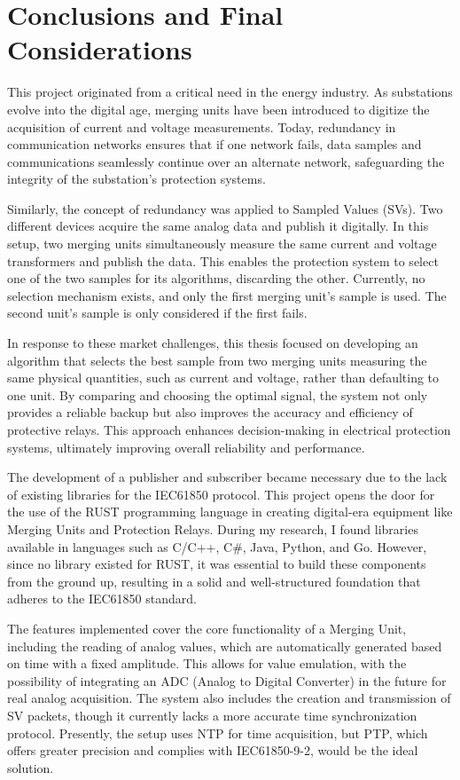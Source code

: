 \section{Conclusions and Final Considerations}

This project originated from a critical need in the energy industry. As substations evolve into the digital age, merging units have been introduced to digitize the acquisition of current and voltage measurements. Today, redundancy in communication networks ensures that if one network fails, data samples and communications seamlessly continue over an alternate network, safeguarding the integrity of the substation's protection systems.

Similarly, the concept of redundancy was applied to Sampled Values (SVs). Two different devices acquire the same analog data and publish it digitally. In this setup, two merging units simultaneously measure the same current and voltage transformers and publish the data. This enables the protection system to select one of the two samples for its algorithms, discarding the other. Currently, no selection mechanism exists, and only the first merging unit’s sample is used. The second unit’s sample is only considered if the first fails.

In response to these market challenges, this thesis focused on developing an algorithm that selects the best sample from two merging units measuring the same physical quantities, such as current and voltage, rather than defaulting to one unit. By comparing and choosing the optimal signal, the system not only provides a reliable backup but also improves the accuracy and efficiency of protective relays. This approach enhances decision-making in electrical protection systems, ultimately improving overall reliability and performance.

The development of a publisher and subscriber became necessary due to the lack of existing libraries for the IEC61850 protocol. This project opens the door for the use of the RUST programming language in creating digital-era equipment like Merging Units and Protection Relays. During my research, I found libraries available in languages such as C/C++, C\#, Java, Python, and Go. However, since no library existed for RUST, it was essential to build these components from the ground up, resulting in a solid and well-structured foundation that adheres to the IEC61850 standard.

The features implemented cover the core functionality of a Merging Unit, including the reading of analog values, which are automatically generated based on time with a fixed amplitude. This allows for value emulation, with the possibility of integrating an ADC (Analog to Digital Converter) in the future for real analog acquisition. The system also includes the creation and transmission of SV packets, though it currently lacks a more accurate time synchronization protocol. Presently, the setup uses NTP for time acquisition, but PTP, which offers greater precision and complies with IEC61850-9-2, would be the ideal solution.

